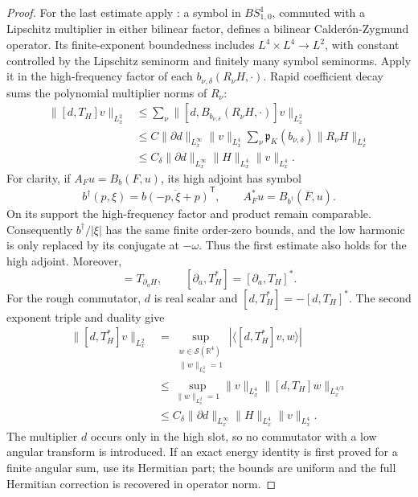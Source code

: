 \documentclass[11pt,a4paper]{article}
\numberwithin{equation}{section}
\newcommand{\R}{\mathbb R}
\theoremstyle{definition}
\begin{document}
\begin{proof}
For the last estimate apply \cite[Theorem 1]{BenyiOh}: a symbol in
$BS^1_{1,0}$, commuted with a Lipschitz multiplier in either bilinear factor,
defines a bilinear Calder\'on-Zygmund operator. Its finite-exponent
boundedness includes $L^4\times L^4\to L^2$, with constant controlled by
the Lipschitz seminorm and finitely many symbol seminorms. Apply it in
the high-frequency factor of each $b_{\nu,\delta}(R_\nu H,\cdot)$. Rapid coefficient
decay sums the polynomial multiplier norms of $R_\nu$:
\begin{equation*}
\begin{aligned}
\|[d,T_H]v\|_{L^2_x}
&\leq\sum_\nu\|[d,B_{b_{\nu,\delta}}(R_\nu H,\cdot)]v\|_{L^2_x}\\
&\leq C\|\partial d\|_{L^\infty_x}\|v\|_{L^4_x}
       \sum_\nu\mathfrak p_K(b_{\nu,\delta})\|R_\nu H\|_{L^4_x}\\
&\leq C_\delta\|\partial d\|_{L^\infty_x}\|H\|_{L^4_x}\|v\|_{L^4_x}.
\end{aligned}
\end{equation*}
For clarity, if $A_Fu=B_b(F,u)$, its high adjoint has symbol
\begin{equation*}
 b^\dagger(p,\xi)=\overline{b(-p,\xi+p)}^{\mathsf T},
 \qquad A_F^*u=B_{b^\dagger}(\overline F,u).
\end{equation*}
On its support the high-frequency factor and product remain comparable.
Consequently $b^\dagger/|\xi|$ has the same finite order-zero bounds,
and the low harmonic is only replaced by its conjugate at $-\omega$.
Thus the first estimate also holds for the high adjoint. Moreover,
\begin{equation*}
 [\partial_a,T_H]=T_{\partial_aH},\qquad
 [\partial_a,T_H^*]=[\partial_a,T_H]^*.
\end{equation*}
For the rough commutator, $d$ is real scalar and
$[d,T_H^*]=-[d,T_H]^*$. The second exponent triple and duality give
\begin{equation*}
\begin{aligned}
\|[d,T_H^*]v\|_{L^2_x}
&=\sup_{\substack{w\in\mathcal S(\R^4)\\\|w\|_{L^2_x}=1}}
       |\langle[d,T_H^*]v,w\rangle|\\
&\leq\sup_{\|w\|_{L^2_x}=1}
       \|v\|_{L^4_x}\|[d,T_H]w\|_{L^{4/3}_x}\\
&\leq C_\delta\|\partial d\|_{L^\infty_x}
       \|H\|_{L^4_x}\|v\|_{L^4_x}.
\end{aligned}
\end{equation*}
The multiplier $d$
occurs only in the high slot, so no commutator with a low angular
transform is introduced. If an exact energy identity is first proved
for a finite angular sum, use its Hermitian part; the bounds are
uniform and the full Hermitian correction is recovered in operator
norm.

\end{proof}
\end{document}
